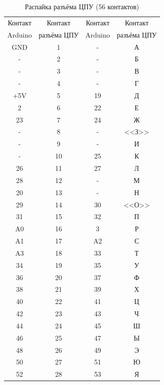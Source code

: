 \documentclass[12pt, a4paper]{article}
\begin{document}
\begin{table}
\begin{center}
\caption{Распайка разъёма ЦПУ (56 контактов)}
\begin{tabular}{cccc}
\hline \hline
Контакт & Контакт & Контакт & Контакт \\
Arduino & разъёма ЦПУ & Arduino & разъёма ЦПУ \\
\hline
GND & 1 & - & А \\
- & 2 & - & Б \\
- & 3 & - & В \\
- & 4 & - & Г \\
+5V & 5 & 19 & Д \\
2 & 6 & 22 & Е \\
23 & 7 & 24 & Ж \\
- & 8 & - & <<З>> \\
- & 9 & - & И \\
- & 10 & 25 & К \\
26 & 11 & 27 & Л \\
28 & 12 & - & М \\
20 & 13 & - & Н \\
29 & 14 & 30 & <<О>> \\
31 & 15 & 32 & П \\
A0 & 16 & 3 & Р \\
A1 & 17 & A2 & С \\
A3 & 18 & 33 & Т \\
34 & 19 & 35 & У \\
36 & 20 & 37 & Ф \\
38 & 21 & 39 & Х \\
40 & 22 & 41 & Ц \\
42 & 23 & 43 & Ч \\
44 & 24 & 45 & Ш \\
46 & 25 & 47 & Ы \\
48 & 26 & 49 & Э \\
50 & 27 & 51 & Ю \\
52 & 28 & 53 & Я \\
\hline \hline
\end{tabular}
\label{tab_cpu_wires}
\end{center}
\end{table}
\end{document}
